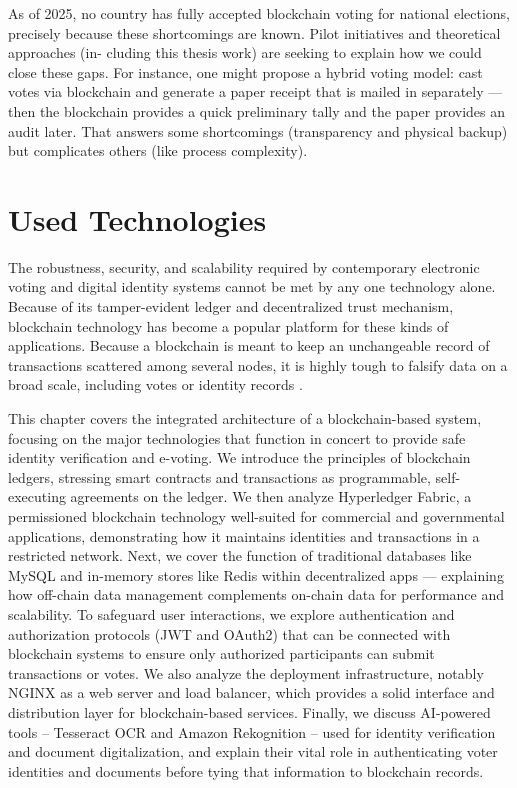 \documentclass[a4paper,10pt]{report}
\begin{document}
 As of 2025, no country has fully accepted blockchain voting for national elections, precisely because these shortcomings are known.  Pilot initiatives and theoretical approaches (in- cluding this thesis work) are seeking to explain how we could close these gaps.  For instance, one might propose a hybrid voting model: cast votes via blockchain and generate a paper receipt that is mailed in separately — then the blockchain provides a quick preliminary tally and the paper provides an audit later.  That answers some shortcomings (transparency and physical backup) but complicates others (like process complexity).

 \chapter{Used Technologies}

 The robustness, security, and scalability required by contemporary electronic voting and digital identity systems cannot be met by any one technology alone. Because of its tamper-evident ledger and decentralized trust mechanism, blockchain technology has become a popular platform for these kinds of applications. Because a blockchain is meant to keep an unchangeable record of transactions scattered among several nodes, it is highly tough to falsify data on a broad scale, including votes or identity records \cite{jafar2021blockchain}.

 This chapter covers the integrated architecture of a blockchain-based system, focusing on the major technologies that function in concert to provide safe identity verification and e-voting.  We introduce the principles of blockchain ledgers, stressing smart contracts and transactions as programmable, self-executing agreements on the ledger.  We then analyze Hyperledger Fabric, a permissioned blockchain technology well-suited for commercial and governmental applications, demonstrating how it maintains identities and transactions in a restricted network.  Next, we cover the function of traditional databases like MySQL and in-memory stores like Redis within decentralized apps — explaining how off-chain data management complements on-chain data for performance and scalability.  To safeguard user interactions, we explore authentication and authorization protocols (JWT and OAuth2) that can be connected with blockchain systems to ensure only authorized participants can submit transactions or votes.  We also analyze the deployment infrastructure, notably NGINX as a web server and load balancer, which provides a solid interface and distribution layer for blockchain-based services.  Finally, we discuss AI-powered tools – Tesseract OCR and Amazon Rekognition – used for identity verification and document digitalization, and explain their vital role in authenticating voter identities and documents before tying that information to blockchain records.
\end{document}
